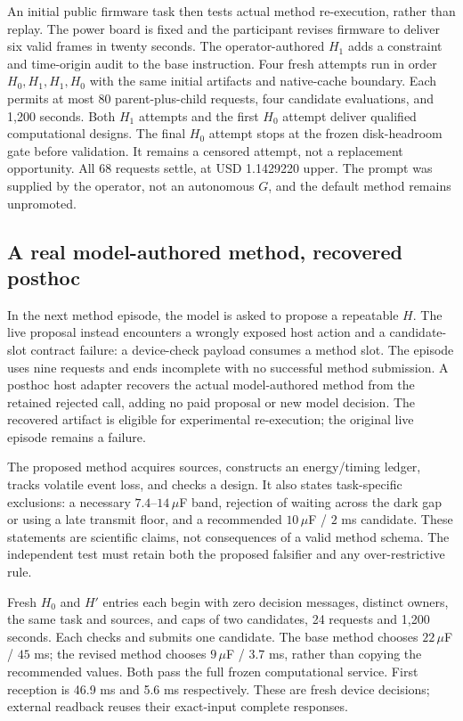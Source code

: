 An initial public firmware task then tests actual method re-execution, rather
than replay. The power board is fixed and the participant revises firmware to
deliver six valid frames in twenty seconds. The operator-authored $H_1$ adds a
constraint and time-origin audit to the base instruction. Four fresh attempts
run in order $H_0,H_1,H_1,H_0$ with the same initial artifacts and native-cache
boundary. Each permits at most 80 parent-plus-child requests, four candidate
evaluations, and 1,200 seconds. Both $H_1$ attempts and the first $H_0$ attempt
deliver qualified computational designs. The final $H_0$ attempt stops at the
frozen disk-headroom gate before validation. It remains a censored attempt,
not a replacement opportunity. All 68 requests settle, at USD 1.1429220 upper.
The prompt was supplied by the operator, not an autonomous $G$, and the default
method remains unpromoted.

\subsection{A real model-authored method, recovered posthoc}
In the next method episode, the model is asked to propose a repeatable $H$.
The live proposal instead encounters a wrongly exposed host action and a
candidate-slot contract failure: a device-check payload consumes a method slot.
The episode uses nine requests and ends incomplete with no successful method
submission. A posthoc host adapter recovers the actual model-authored method
from the retained rejected call, adding no paid proposal or new model decision.
The recovered artifact is eligible for experimental re-execution; the original
live episode remains a failure.

The proposed method acquires sources, constructs an energy/timing ledger,
tracks volatile event loss, and checks a design. It also states task-specific
exclusions: a necessary $7.4$--$14\,\mu$F band, rejection of waiting across the
dark gap or using a late transmit floor, and a recommended
$10\,\mu$F / $2$ ms candidate. These statements are scientific claims, not
consequences of a valid method schema. The independent test must retain both
the proposed falsifier and any over-restrictive rule.

Fresh $H_0$ and $H'$ entries each begin with zero decision messages, distinct
owners, the same task and sources, and caps of two candidates, 24 requests and
1,200 seconds. Each checks and submits one candidate. The base method chooses
$22\,\mu$F / $45$ ms; the revised method chooses $9\,\mu$F / $3.7$ ms, rather
than copying the recommended values. Both pass the full frozen computational
service. First reception is 46.9 ms and 5.6 ms respectively. These are fresh
device decisions; external readback reuses their exact-input complete responses.

